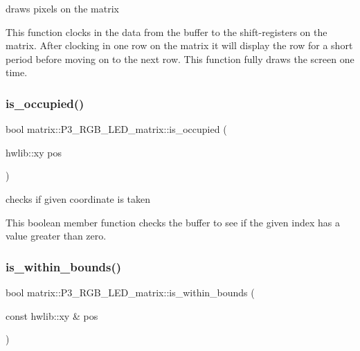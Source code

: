 draws pixels on the matrix 

This function clocks in the data from the buffer to the shift-\/registers on the matrix. After clocking in one row on the matrix it will display the row for a short period before moving on to the next row. This function fully draws the screen one time. \mbox{\label{classmatrix_1_1P3__RGB__LED__matrix_a6a402271f9f13d646be69fe39e5b08b6}} 
\subsubsection{\texorpdfstring{is\+\_\+occupied()}{is\_occupied()}}
{\footnotesize\ttfamily bool matrix\+::\+P3\+\_\+\+R\+G\+B\+\_\+\+L\+E\+D\+\_\+matrix\+::is\+\_\+occupied (\begin{DoxyParamCaption}\item[{hwlib\+::xy}]{pos }\end{DoxyParamCaption})\hspace{0.3cm}{\ttfamily [inline]}}



checks if given coordinate is taken 

This boolean member function checks the buffer to see if the given index has a value greater than zero. \mbox{\label{classmatrix_1_1P3__RGB__LED__matrix_a217534f5145dad527103fa2c17484b6a}} 
\subsubsection{\texorpdfstring{is\+\_\+within\+\_\+bounds()}{is\_within\_bounds()}}
{\footnotesize\ttfamily bool matrix\+::\+P3\+\_\+\+R\+G\+B\+\_\+\+L\+E\+D\+\_\+matrix\+::is\+\_\+within\+\_\+bounds (\begin{DoxyParamCaption}\item[{const hwlib\+::xy \&}]{pos }\end{DoxyParamCaption})\hspace{0.3cm}{\ttfamily [inline]}}



